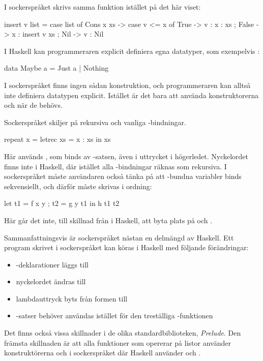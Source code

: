 \documentclass[Rapport]{subfiles}
\begin{document}
I sockerspråket skrivs samma funktion istället på det här viset:

\begin{codeEx}
  insert v list = case list of
      { Cons x xs -> case v <= x of
          { True  -> v : x : xs
          ; False -> x : insert v xs
          }
      ; Nil -> v : Nil
      }
\end{codeEx}

I Haskell kan programmeraren explicit definiera egna datatyper, som exempelvis :
    
\begin{codeEx}
data Maybe a = Just a | Nothing
\end{codeEx}

I sockerspråket finns ingen sådan konstruktion, och programmeraren kan alltså inte
definiera datatypen explicit. Istället är det bara att använda
konstruktorerna  och  när de behövs.


Sockerspråket skiljer på rekursiva och vanliga -bindningar. 

\begin{codeEx}
repeat x = letrec xs = x : xs in xs  
\end{codeEx}

Här används , som binds av -satsen, även i uttrycket i högerledet.
Nyckelordet  finns inte i Haskell, där istället alla -bindningar räknas som rekursiva. I
sockerspråket måste användaren också tänka på att -bundna variabler binds
sekvensiellt, och därför måste skrivas i ordning:

\begin{codeEx}
let { t1 = f x y
    ; t2 = g y t1
    }
in  h t1 t2
\end{codeEx}

Här går det inte, till skillnad från i Haskell, att byta plats på  och .

Sammanfattningsvis är sockerspråket nästan en delmängd av Haskell. Ett program
skrivet i sockerspråket kan köras i Haskell med följande förändringar:
\begin{itemize}
    \item {}-deklarationer läggs till
    \item nyckelordet  ändras till 
    \item lambdauttryck byts från formen  till 
    \item {}-satser behöver användas 
          istället för den treställiga -funktionen 
\end{itemize}
Det finns också vissa skillnader i de olika standardbiblioteken, \emph{Prelude}.
Den främsta skillnaden är att alla funktioner som opererar på listor använder 
konstruktörerna  och  i sockerspråket
där Haskell använder \ic{(:)} och \ic{[]}.
\end{document}
